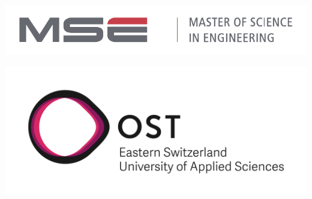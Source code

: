 
\begin{titlepage}





 	\noindent
	\vspace{-2cm} 
	\begin{center}
		\begin{minipage}{0.5\textwidth}%
			\begin{flushleft}
				\includegraphics[width=1.0\textwidth]{header/mse-full-grey-large}%
			\end{flushleft}
		\end{minipage}\hfill
		\begin{minipage}{0.5\textwidth}%
			\begin{flushright}
				\includegraphics[scale=0.8]{header/ost_logo_enlish}\\
			\end{flushright}
		\end{minipage}
	\end{center}


\end{titlepage}
